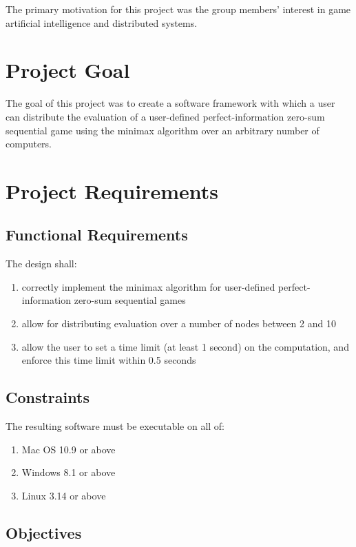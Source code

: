 \documentclass[pdftex,12pt,a4paper]{article}
\begin{document}
The primary motivation for this project was the group members’ interest in game artificial intelligence and distributed systems.

%
%
\section{Project Goal}

The goal of this project was to create a software framework with which a user can distribute the evaluation of a user-defined perfect-information zero-sum sequential game using the minimax algorithm over an arbitrary number of computers.

%
%
\section{Project Requirements}\label{sec:requirements}

\subsection{Functional Requirements}

The design shall:
\begin{enumerate}
\item correctly implement the minimax algorithm for user-defined perfect-information zero-sum sequential games
\item allow for distributing evaluation over a number of nodes between 2 and 10
\item allow the user to set a time limit (at least 1 second) on the computation, and enforce this time limit within 0.5 seconds
\end{enumerate}

\subsection{Constraints}\label{sec:constraints}

The resulting software must be executable on all of:
\begin{enumerate}
\item Mac OS 10.9 or above
\item Windows 8.1 or above
\item Linux 3.14 or above
\end{enumerate}

\subsection{Objectives}\label{sec:objectives}
\end{document}
